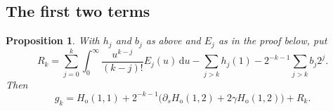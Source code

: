 \documentclass[11pt]{amsart}
\theoremstyle{plain}
\newtheorem{proposition}[theorem]{Proposition}
\theoremstyle{definition}
\newcommand{\dd}{\,\mathrm d}
\begin{document}
\subsection{The first two terms}

\begin{proposition}\label{prop:odd-two-term}
With $h_j$ and $b_j$ as above and $E_j$ as in the proof below, put
\begin{equation}\label{eq:Rk-def}
 R_k=\sum_{j=0}^k\int_0^\infty\frac{u^{k-j}}{(k-j)!}E_j(u)\dd u
     -\sum_{j>k}h_j(1)
     -2^{-k-1}\sum_{j>k}b_j2^j.
\end{equation}
Then
\begin{equation}\label{eq:odd-two-term}
 g_k
 =H_{\mathrm o}(1,1)
  +2^{-k-1}\bigl(\partial_sH_{\mathrm o}(1,2)
                  +2\gamma H_{\mathrm o}(1,2)\bigr)+R_k.
\end{equation}
\end{proposition}
\end{document}
